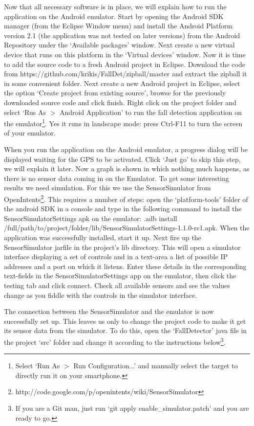 \documentclass[a4paper, 10pt]{article}
\begin{document}
Now that all necessary software is in place, we will explain how to run the application on the Android emulator. Start by opening the Android SDK manager (from the Eclipse Window menu) and install the Android Platform version 2.1 (the application was not tested on later versions) from the Android Repository under the `Available packages' window. Next create a new virtual device that runs on this platform in the `Virtual devices' window. Now it is time to add the source code to a fresh Android project in Eclipse. Download the code from https://github.com/krikis/FallDet/zipball/master and extract the zipball it in some convenient folder. Next create a new Android project in Eclipse, select the option `Create project from existing source', browse for the previously downloaded source code and click finish. Right click on the project folder and select `Rus As $>$ Android Application' to run the fall detection application on the emulator\footnote{Select `Run As $>$ Run Configuration...' and manually select the target to directly run it on your smartphone.}. Yes it runs in landscape mode: press Ctrl-F11 to turn the screen of your emulator.

When you run the application on the Android emulator, a progress dialog will be displayed waiting for the GPS to be activated. Click `Just go' to skip this step, we will explain it later. Now a graph is shown in which nothing much happens, as there is no sensor data coming in on the Emulator. To get some interesting results we need simulation. For this we use the SensorSimulator from OpenIntents\footnote{http://code.google.com/p/openintents/wiki/SensorSimulator}. This requires a number of steps: open the `platform-tools' folder of the android SDK in a console and type in the following command to install the SensorSimulatorSettings apk on the emulator: .adb install /full/path/to/project/folder/lib/SensorSimulatorSettings-1.1.0-rc1.apk. When the application was successfully installed, start it up. Next fire up the SensorSimulator jarfile in the project's lib directory. This will open a simulator interface displaying a set of controls and in a text-area a list of possible IP addresses and a port on which it listens. Enter these details in the corresponding text-fields in the SensorSimulatorSettings app on the emulator, then click the testing tab and click connect. Check all available sensors and see the values change as you fiddle with the controls in the simulator interface.

The connection between the SensorSimulator and the emulator is now successfully set up. This leaves us only to change the project code to make it get its sensor data from the simulator. To do this, open the `FallDetector' java file in the project `src' folder and change it according to the instructions below\footnote{If you are a Git man, just run `git apply enable\_simulator.patch' and you are ready to go.}.
\end{document}
